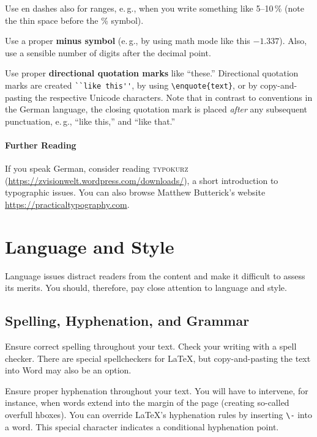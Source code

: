 Use en dashes also for ranges, e.\,g., when you write something like 5--10\,\% (note the thin space before the \% symbol).

Use a proper \textbf{minus symbol} (e.\,g., by using math mode like this \(-1.337\)). Also, use a sensible number of digits after the decimal point.

Use proper \textbf{directional quotation marks} like ``these.'' Directional quotation marks are created  \verb|``like this''|, by using \verb|\enquote{text}|, or by copy-and-pasting the respective Unicode characters. Note that in contrast to conventions in the German language, the closing quotation mark is placed \emph{after} any subsequent punctuation, e.\,g., ``like this,'' and ``like that.''

\paragraph{Further Reading}

If you speak German, consider reading \textsc{typokurz} (\url{https://zvisionwelt.wordpress.com/downloads/}), a short introduction to typographic issues. You can also browse Matthew Butterick's website \url{https://practicaltypography.com}.

\section{Language and Style}

Language issues distract readers from the content and make it difficult to assess its merits. You should, therefore, pay close attention to language and style.

\subsection{Spelling, Hyphenation, and Grammar}

Ensure correct spelling throughout your text. Check your writing with a spell checker. There are special spellcheckers for LaTeX, but copy-and-pasting the text into Word may also be an option.

Ensure proper hyphenation throughout your text. You will have to intervene, for instance, when words extend into the margin of the page (creating so-called overfull hboxes). You can override LaTeX's hyphenation rules by inserting \verb|\-| into a word. This special character indicates a conditional hyphenation point.

